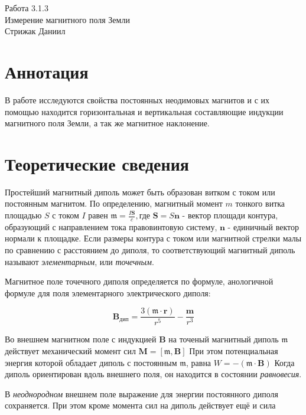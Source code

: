 



\begin{center}
  \LARGE{Работа 3.1.3}\\[0.2cm]
  \LARGE{Измерение магнитного поля Земли}\\[0.2cm]
  \large{Стрижак Даниил}\\[0.2cm]
\end{center}  
  

\section{Аннотация}

В работе исследуются свойства постоянных неодимовых магнитов и с их помощью находится горизонтальная и вертикальная составляющие индукции магнитного поля Земли, а так же магнитное наклонение.

\section{Теоретические сведения}

Простейший магнитный диполь может быть образован витком с током или постоянным магнитом. По определению, магнитный момент $m$ тонкого витка площадью $S$ с током $I$ равен $\mathfrak{m} = \frac{I\textbf{S}}{c}, $где $\textbf{S} = S\textbf{n}$ - вектор площади контура, образующий с направлением тока правовинтовую систему, $\textbf{n}$ - единичный вектор нормали к площадке. Если размеры контура с током или магнитной стрелки малы по сравнению с расстоянием до диполя, то соответствующий магнитный диполь называют \textit{элементарным}, или \textit{точечным}.

Магнитное поле точечного диполя определяется по формуле, анологичной формуле для поля элементарного электрического диполя:

\[ \textbf{B}_{дип} = \frac{3(\mathfrak{m} \cdot \textbf{r})}{r^5} - \frac{\textbf{m}}{r^3}\]

Во внешнем магнитном поле с индукцией $\textbf{B}$ на точеный магнитный диполь $\mathfrak{m}$ действует механический момент сил $\textbf{M}=[\mathfrak{m}, \textbf{B}] $
При этом потенциальная энергия которой обладает диполь с постоянным $\mathfrak{m}$, равна 
$W = -(\mathfrak{m} \cdot \textbf{B})$
Когда диполь ориентирован вдоль внешнего поля, он находится в состоянии \textit{равновесия}.

В \textit{неоднородном} внешнем поле выражение для энергии постоянного диполя сохраняется. При этом кроме момента сил на диполь действует ещё и сила 

